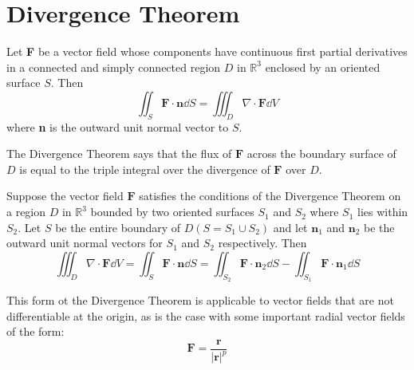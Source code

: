 \documentclass[../calc3.tex]{subfiles}
\begin{document}
\section{Divergence Theorem}
\begin{theorem}
    Let \textbf{F} be a vector field whose components have continuous first partial derivatives in a connected and simply connected region $D$ in $\mathbb{R}^3$ enclosed 
    by an oriented surface $S$. Then 
    \[ \iint_S \textbf{F}\cdot\textbf{n}\dd S = \iiint_D \nabla \cdot \textbf{F}\dd V\]
    where \textbf{n} is the outward unit normal vector to $S$.
    
    The Divergence Theorem says that the flux of $\textbf{F}$ across the boundary surface of $D$ is equal to the triple integral over the divergence of $\textbf{F}$ over $D$.
\end{theorem}

\begin{theorem}
    Suppose the vector field $\textbf{F}$ satisfies the conditions of the Divergence Theorem on a region $D$ in $\mathbb{R}^3$ bounded by two oriented surfaces 
    $S_1$ and $S_2$ where $S_1$ lies within $S_2$. Let $S$ be the entire boundary of $D (S=S_1 \cup S_2)$ and let $\textbf{n}_1$ and $\textbf{n}_2$ be the outward unit normal vectors for $S_1$ and $S_2$ respectively. Then 
    \[\iiint_D \nabla \cdot \textbf{F} \dd V = \iint_S \textbf{F}\cdot\textbf{n}\dd S = \iint_{S_2} \textbf{F}\cdot\textbf{n}_2\dd S - \iint_{S_1}\textbf{F}\cdot\textbf{n}_1\dd S\]

    This form ot the Divergence Theorem is applicable to vector fields that are not differentiable at the origin, as is the case with some important 
    radial vector fields of the form:
    \[\textbf{F}=\frac{\textbf{r}}{|\textbf{r}|^p}\]
\end{theorem}
\end{document}
